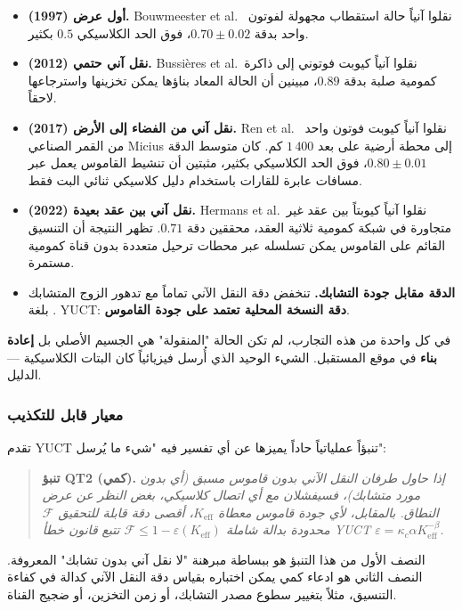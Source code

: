 \documentclass[12pt,a4paper]{article}
\theoremstyle{remark}
\begin{document}
	\begin{itemize}
		\item \textbf{أول عرض (1997).} Bouwmeester et al.\ \cite{Bouwmeester1997} نقلوا آنياً حالة استقطاب مجهولة لفوتون واحد بدقة \(0.70 \pm 0.02\)، فوق الحد الكلاسيكي \(0.5\) بكثير.
		\item \textbf{نقل آني حتمي (2012).} Bussi\`eres et al.\ نقلوا آنياً كيوبت فوتوني إلى ذاكرة كمومية صلبة بدقة \(0.89\)، مبينين أن الحالة المعاد بناؤها يمكن تخزينها واسترجاعها لاحقاً.
		\item \textbf{نقل آني من الفضاء إلى الأرض (2017).} Ren et al.\ \cite{Ren2017} نقلوا آنياً كيوبت فوتون واحد من القمر الصناعي Micius إلى محطة أرضية على بعد \(1\,400\) كم. كان متوسط الدقة \(0.80 \pm 0.01\)، فوق الحد الكلاسيكي بكثير، مثبتين أن تنشيط القاموس يعمل عبر مسافات عابرة للقارات باستخدام دليل كلاسيكي ثنائي البت فقط.
		\item \textbf{نقل آني بين عقد بعيدة (2022).} Hermans et al.\ نقلوا آنياً كيوبتاً بين عقد غير متجاورة في شبكة كمومية ثلاثية العقد، محققين دقة \(0.71\). تظهر النتيجة أن التنسيق القائم على القاموس يمكن تسلسله عبر محطات ترحيل متعددة بدون قناة كمومية مستمرة.
		\item \textbf{الدقة مقابل جودة التشابك.} تنخفض دقة النقل الآني تماماً مع تدهور الزوج المتشابك \cite{Knill2005}. بلغة YUCT: \textbf{دقة النسخة المحلية تعتمد على جودة القاموس}.
	\end{itemize}
	
	في كل واحدة من هذه التجارب، لم تكن الحالة "المنقولة" هي الجسيم الأصلي بل \textbf{إعادة بناء} في موقع المستقبل. الشيء الوحيد الذي أُرسل فيزيائياً كان البتات الكلاسيكية — الدليل.
	
	\subsubsection{معيار قابل للتكذيب}
	
	تقدم YUCT تنبؤاً عملياتياً حاداً يميزها عن أي تفسير فيه "شيء ما يُرسل":
	
	\begin{quote}
		\textbf{تنبؤ QT2 (كمي).} \emph{إذا حاول طرفان النقل الآني بدون قاموس مسبق (أي بدون مورد متشابك)، فسيفشلان مع أي اتصال كلاسيكي، بغض النظر عن عرض النطاق. بالمقابل، لأي جودة قاموس معطاة \(K_{\mathrm{eff}}\)، أقصى دقة قابلة للتحقيق \(\mathcal{F}\) محدودة بدالة شاملة \(\mathcal{F} \le 1 - \varepsilon(K_{\mathrm{eff}})\) تتبع قانون خطأ YUCT \(\varepsilon = \kappa_c \alpha K_{\mathrm{eff}}^{-\beta}\).}
	\end{quote}
	
	النصف الأول من هذا التنبؤ هو ببساطة مبرهنة "لا نقل آني بدون تشابك" المعروفة. النصف الثاني هو ادعاء كمي يمكن اختباره بقياس دقة النقل الآني كدالة في كفاءة التنسيق، مثلاً بتغيير سطوع مصدر التشابك، أو زمن التخزين، أو ضجيج القناة.
	
\end{document}
